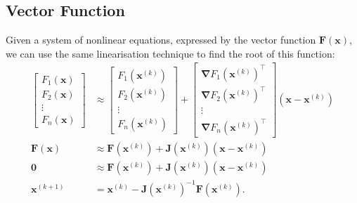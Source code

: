 \documentclass{article}
\begin{document}
\subsection{Vector Function}
Given a system of nonlinear equations, expressed by the vector function
\(\symbf{F}\left( \symbf{x} \right)\), we can use the same
linearisation technique to find the root of this function:
\begin{align*}
    \begin{bmatrix}
        F_1\left( \symbf{x} \right) \\
        F_2\left( \symbf{x} \right) \\
        \vdots                      \\
        F_n\left( \symbf{x} \right)
    \end{bmatrix}
                                      & \approx
    \begin{bmatrix}
        F_1\left( \symbf{x}^{\left( k \right)} \right) \\
        F_2\left( \symbf{x}^{\left( k \right)} \right) \\
        \vdots                                         \\
        F_n\left( \symbf{x}^{\left( k \right)} \right)
    \end{bmatrix}
    +
    \begin{bmatrix}
        \symbf{\nabla} F_1\left( \symbf{x}^{\left( k \right)} \right)^\top \\
        \symbf{\nabla} F_2\left( \symbf{x}^{\left( k \right)} \right)^\top \\
        \vdots                                                             \\
        \symbf{\nabla} F_n\left( \symbf{x}^{\left( k \right)} \right)^\top
    \end{bmatrix}
    \left( \symbf{x} - \symbf{x}^{\left( k \right)} \right)                                                                                                                                                         \\
    \symbf{F}\left( \symbf{x} \right) & \approx \symbf{F}\left( \symbf{x}^{\left( k \right)} \right) + \symbf{J}\left( \symbf{x}^{\left( k \right)} \right) \left( \symbf{x} - \symbf{x}^{\left( k \right)} \right) \\
    \symbf{0}                         & \approx \symbf{F}\left( \symbf{x}^{\left( k \right)} \right) + \symbf{J}\left( \symbf{x}^{\left( k \right)} \right) \left( \symbf{x} - \symbf{x}^{\left( k \right)} \right) \\
    \symbf{x}^{\left( k+1 \right)}    & = \symbf{x}^{\left( k \right)} - \symbf{J}\left( \symbf{x}^{\left( k \right)} \right)^{-1} \symbf{F}\left( \symbf{x}^{\left( k \right)} \right).
\end{align*}
\end{document}
